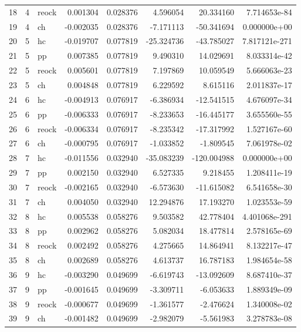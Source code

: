 \documentclass[]{article}
\begin{document}
\begin{tabular}{lrlrrrrr}
18 &      4 &  reock &   0.001304 &  0.028376 &      4.596054 &   20.334160 &   7.714653e-84 \\
19 &      4 &     ch &  -0.002035 &  0.028376 &     -7.171113 &  -50.341694 &   0.000000e+00 \\
20 &      5 &     hc &  -0.019707 &  0.077819 &    -25.324736 &  -43.785027 &  7.817121e-271 \\
21 &      5 &     pp &   0.007385 &  0.077819 &      9.490310 &   14.029691 &   8.033314e-42 \\
22 &      5 &  reock &   0.005601 &  0.077819 &      7.197869 &   10.059549 &   5.666063e-23 \\
23 &      5 &     ch &   0.004848 &  0.077819 &      6.229592 &    8.615116 &   2.011837e-17 \\
24 &      6 &     hc &  -0.004913 &  0.076917 &     -6.386934 &  -12.541515 &   4.676097e-34 \\
25 &      6 &     pp &  -0.006333 &  0.076917 &     -8.233653 &  -16.445177 &   3.655560e-55 \\
26 &      6 &  reock &  -0.006334 &  0.076917 &     -8.235342 &  -17.317992 &   1.527167e-60 \\
27 &      6 &     ch &  -0.000795 &  0.076917 &     -1.033852 &   -1.809545 &   7.061978e-02 \\
28 &      7 &     hc &  -0.011556 &  0.032940 &    -35.083239 & -120.004988 &   0.000000e+00 \\
29 &      7 &     pp &   0.002150 &  0.032940 &      6.527335 &    9.218455 &   1.208411e-19 \\
30 &      7 &  reock &  -0.002165 &  0.032940 &     -6.573630 &  -11.615082 &   6.541658e-30 \\
31 &      7 &     ch &   0.004050 &  0.032940 &     12.294876 &   17.193270 &   1.023553e-59 \\
32 &      8 &     hc &   0.005538 &  0.058276 &      9.503582 &   42.778404 &  4.401068e-291 \\
33 &      8 &     pp &   0.002962 &  0.058276 &      5.082034 &   18.477814 &   2.578165e-69 \\
34 &      8 &  reock &   0.002492 &  0.058276 &      4.275665 &   14.864941 &   8.132217e-47 \\
35 &      8 &     ch &   0.002689 &  0.058276 &      4.613737 &   16.787183 &   1.984654e-58 \\
36 &      9 &     hc &  -0.003290 &  0.049699 &     -6.619743 &  -13.092609 &   8.687410e-37 \\
37 &      9 &     pp &  -0.001645 &  0.049699 &     -3.309711 &   -6.053633 &   1.889349e-09 \\
38 &      9 &  reock &  -0.000677 &  0.049699 &     -1.361577 &   -2.476624 &   1.340008e-02 \\
39 &      9 &     ch &  -0.001482 &  0.049699 &     -2.982079 &   -5.561983 &   3.278783e-08 \\
\bottomrule
\end{tabular}


\end{document}
